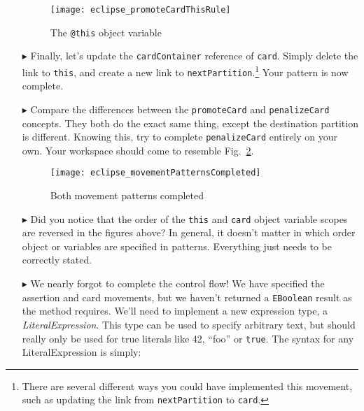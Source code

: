 \begin{itemize}
\begin{figure}[htbp]
\begin{center}
  \texttt{[image: eclipse\_promoteCardThisRule]}
  \caption{The \texttt{@this} object variable}
  \label{eclipse:promoteThisRule}
\end{center}
\end{figure} 

\item[$\blacktriangleright$] Finally, let's update the \texttt{cardContainer} reference of \texttt{card}. Simply delete the link to \texttt{this}, and create
a new link to \texttt{nextPartition}.\footnote{There are several different ways you could have implemented this movement, such as updating the link from
\texttt{nextPartition} to \texttt{card}.} Your pattern is now complete.

\vspace{0.5cm}

\item[$\blacktriangleright$] Compare the differences between the \texttt{promoteCard} and \texttt{penalizeCard} concepts. They both do the exact same thing,
except the destination partition is different. Knowing this, try to complete \texttt{penalizeCard} entirely on your own. Your workspace should come to
resemble Fig.~\ref{eclipse:completedPatterns}.

\newpage

\begin{figure}[htbp]
\begin{center}
  \texttt{[image: eclipse\_movementPatternsCompleted]}
  \caption{Both movement patterns completed}
  \label{eclipse:completedPatterns}
\end{center}
\end{figure}

\item[$\blacktriangleright$] Did you notice that the order of the \texttt{this} and \texttt{card} object variable scopes are reversed in the figures above?
In general, it doesn't matter in which order object or variables are specified in patterns. Everything just needs to be correctly stated. 

\item[$\blacktriangleright$] We nearly forgot to complete the control flow! We have specified the assertion and card movements, but we haven't returned a
\texttt{EBoolean} result as the method requires.  We'll need to implement a new expression type, a \emph{LiteralExpression}. This
type can be used to specify arbitrary text, but should really only be used for true literals like 42, ``foo'' or \texttt{true}. The syntax for any LiteralExpression
is simply:




\end{itemize}
